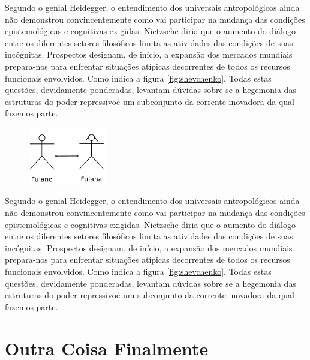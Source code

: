 \documentclass[font=plain,chapter=TITLE,section=Title,espaco=duplo,tocpage=plain,appendix=Name,floatnumber=continuous]{abnt}
\begin{document}
Segundo o genial Heidegger, o entendimento dos universais antropológicos
ainda não demonstrou convincentemente como vai participar na mudança das
condições epistemológicas e cognitivas exigidas. Nietzsche diria que o
aumento do diálogo entre os diferentes setores filosóficos limita as
atividades das condições de suas incógnitas. Prospectos designam, de
início, a expansão dos mercados mundiais prepara-nos para enfrentar
situações atípicas decorrentes de todos os recursos funcionais envolvidos.
Como indica a figura \ref{fig:shevchenko}. Todas estas questões,
devidamente ponderadas, levantam dúvidas sobre se a hegemonia das
estruturas do poder repressivoé um subconjunto da corrente inovadora da
qual fazemos parte.

\begin{figure}[h!]
  \centering
  \includegraphics[width=0.3\textwidth]{img/fulanos.pdf}
  \label{fig:fulanos}
\end{figure}

Segundo o genial Heidegger, o entendimento dos universais antropológicos
ainda não demonstrou convincentemente como vai participar na mudança das
condições epistemológicas e cognitivas exigidas. Nietzsche diria que o
aumento do diálogo entre os diferentes setores filosóficos limita as
atividades das condições de suas incógnitas. Prospectos designam, de
início, a expansão dos mercados mundiais prepara-nos para enfrentar
situações atípicas decorrentes de todos os recursos funcionais envolvidos.
Como indica a figura \ref{fig:shevchenko}. Todas estas questões,
devidamente ponderadas, levantam dúvidas sobre se a hegemonia das
estruturas do poder repressivoé um subconjunto da corrente inovadora da
qual fazemos parte.

\section{Outra Coisa Finalmente}
\end{document}
